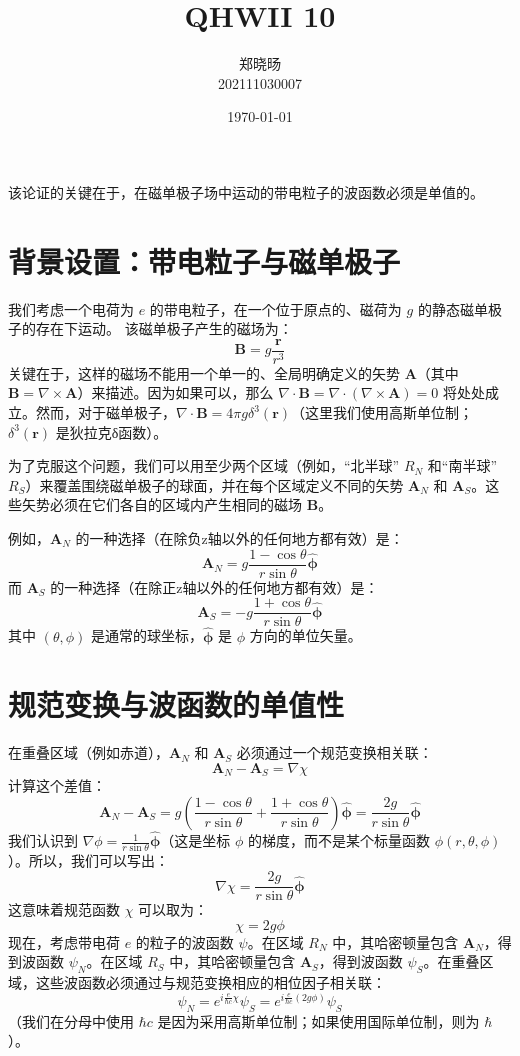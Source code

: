 \documentclass{article}
\begin{document}
\title{QHWII 10}
\author{郑晓旸 \\ 202111030007}
\date{\today}
\maketitle

该论证的关键在于，在磁单极子场中运动的带电粒子的波函数必须是单值的。

\section{背景设置：带电粒子与磁单极子}

我们考虑一个电荷为 \(e\) 的带电粒子，在一个位于原点的、磁荷为 \(g\) 的静态磁单极子的存在下运动。
该磁单极子产生的磁场为：
\[ \mathbf{B} = g \frac{\mathbf{r}}{r^3} \]
关键在于，这样的磁场不能用一个单一的、全局明确定义的矢势 \(\mathbf{A}\)（其中 \(\mathbf{B} = \nabla \times \mathbf{A}\)）来描述。因为如果可以，那么 \(\nabla \cdot \mathbf{B} = \nabla \cdot (\nabla \times \mathbf{A}) = 0\) 将处处成立。然而，对于磁单极子，\(\nabla \cdot \mathbf{B} = 4\pi g \delta^3(\mathbf{r})\)（这里我们使用高斯单位制；\(\delta^3(\mathbf{r})\) 是狄拉克δ函数）。

为了克服这个问题，我们可以用至少两个区域（例如，“北半球” \(R_N\) 和“南半球” \(R_S\)）来覆盖围绕磁单极子的球面，并在每个区域定义不同的矢势 \(\mathbf{A}_N\) 和 \(\mathbf{A}_S\)。这些矢势必须在它们各自的区域内产生相同的磁场 \(\mathbf{B}\)。

例如，\(\mathbf{A}_N\) 的一种选择（在除负z轴以外的任何地方都有效）是：
\[ \mathbf{A}_N = g \frac{1 - \cos\theta}{r\sin\theta} \hat{\mathbf{\phi}} \]
而 \(\mathbf{A}_S\) 的一种选择（在除正z轴以外的任何地方都有效）是：
\[ \mathbf{A}_S = -g \frac{1 + \cos\theta}{r\sin\theta} \hat{\mathbf{\phi}} \]
其中 \((\theta, \phi)\) 是通常的球坐标，\(\hat{\mathbf{\phi}}\) 是 \(\phi\) 方向的单位矢量。

\section{规范变换与波函数的单值性}

在重叠区域（例如赤道），\(\mathbf{A}_N\) 和 \(\mathbf{A}_S\) 必须通过一个规范变换相关联：
\[ \mathbf{A}_N - \mathbf{A}_S = \nabla \chi \]
计算这个差值：
\[ \mathbf{A}_N - \mathbf{A}_S = g \left( \frac{1 - \cos\theta}{r\sin\theta} + \frac{1 + \cos\theta}{r\sin\theta} \right) \hat{\mathbf{\phi}} = \frac{2g}{r\sin\theta} \hat{\mathbf{\phi}} \]
我们认识到 \(\nabla\phi = \frac{1}{r\sin\theta} \hat{\mathbf{\phi}}\)（这是坐标 \(\phi\) 的梯度，而不是某个标量函数 \(\phi(r,\theta,\phi)\)）。所以，我们可以写出：
\[ \nabla \chi = \frac{2g}{r\sin\theta} \hat{\mathbf{\phi}} \]
这意味着规范函数 \(\chi\) 可以取为：
\[ \chi = 2g\phi \]
现在，考虑带电荷 \(e\) 的粒子的波函数 \(\psi\)。在区域 \(R_N\) 中，其哈密顿量包含 \(\mathbf{A}_N\)，得到波函数 \(\psi_N\)。在区域 \(R_S\) 中，其哈密顿量包含 \(\mathbf{A}_S\)，得到波函数 \(\psi_S\)。在重叠区域，这些波函数必须通过与规范变换相应的相位因子相关联：
\[ \psi_N = e^{i \frac{e}{\hbar c} \chi} \psi_S = e^{i \frac{e}{\hbar c} (2g\phi)} \psi_S \]
（我们在分母中使用 \(\hbar c\) 是因为采用高斯单位制；如果使用国际单位制，则为 \(\hbar\)）。
\end{document}
